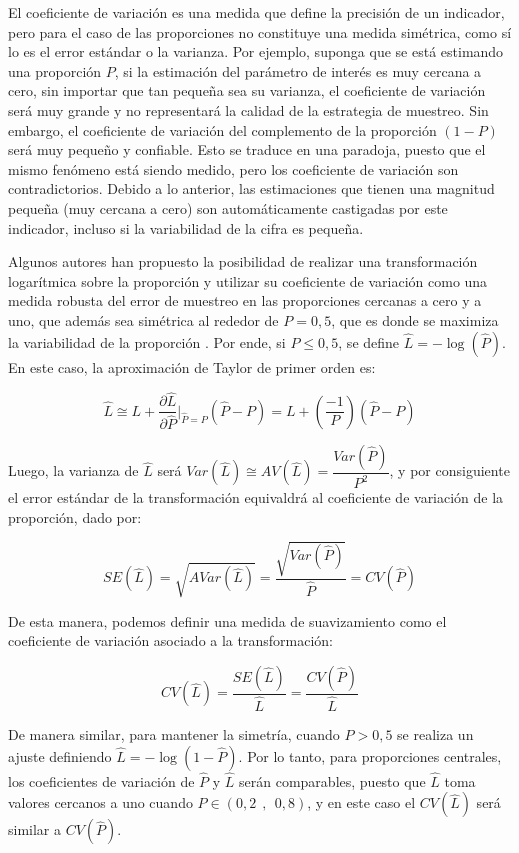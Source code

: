 \documentclass[12pt,spanish,]{book}
\begin{document}
El coeficiente de variación es una medida que define la precisión de un indicador, pero para el caso de las proporciones no constituye una medida simétrica, como sí lo es el error estándar o la varianza. Por ejemplo, suponga que se está estimando una proporción \(P\), si la estimación del parámetro de interés es muy cercana a cero, sin importar que tan pequeña sea su varianza, el coeficiente de variación será muy grande y no representará la calidad de la estrategia de muestreo. Sin embargo, el coeficiente de variación del complemento de la proporción \((1-P)\) será muy pequeño y confiable. Esto se traduce en una paradoja, puesto que el mismo fenómeno está siendo medido, pero los coeficiente de variación son contradictorios. Debido a lo anterior, las estimaciones que tienen una magnitud pequeña (muy cercana a cero) son automáticamente castigadas por este indicador, incluso si la variabilidad de la cifra es pequeña.

Algunos autores han propuesto la posibilidad de realizar una transformación logarítmica sobre la proporción y utilizar su coeficiente de variación como una medida robusta del error de muestreo en las proporciones cercanas a cero y a uno, que además sea simétrica al rededor de \(P=0,5\), que es donde se maximiza la variabilidad de la proporción \autocite{Barnett_Walker_Chromy_Davis_Emrich_Odom_Packer_2003}. Por ende, si \(P\leq 0,5\), se define \(\hat L = -\log( \hat P)\). En este caso, la aproximación de Taylor de primer orden es:

\[
\hat{L} \cong L + \frac{\partial \hat{L}}{\partial \hat{P}}\biggr\rvert_{\hat{P}=P} (\hat{P}-P) = L + \left(\frac{-1}{P}\right)(\hat{P}-P)
\]

Luego, la varianza de \(\hat{L}\) será \(Var(\hat{L})\cong AV(\hat{L}) = \dfrac{Var(\hat{P})}{P^2}\), y por consiguiente el error estándar de la transformación equivaldrá al coeficiente de variación de la proporción, dado por:

\[
SE(\hat{L}) = \sqrt{AVar(\hat{L})} = \dfrac{\sqrt{Var(\hat{P})}}{\hat{P}} = CV(\hat{P}) 
\]

De esta manera, podemos definir una medida de suavizamiento como el coeficiente de variación asociado a la transformación:

\[
CV(\hat{L}) = \dfrac{SE(\hat{L})}{\hat{L}} = \dfrac{CV(\hat{P})}{\hat{L}}
\]

De manera similar, para mantener la simetría, cuando \(P>0,5\) se realiza un ajuste definiendo \(\hat{L} = -\log(1-\hat{P})\). Por lo tanto, para proporciones centrales, los coeficientes de variación de \(\hat{P}\) y \(\hat{L}\) serán comparables, puesto que \(\hat{L}\) toma valores cercanos a uno cuando \(P \in (0,2\ \ ,\ \ 0,8)\), y en este caso el \(CV(\hat{L})\) será similar a \(CV(\hat{P})\).
\end{document}

